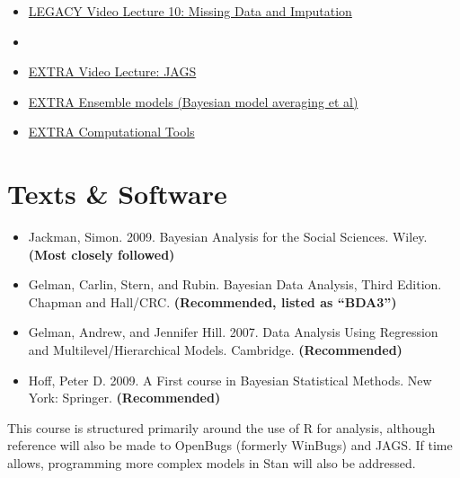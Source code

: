 \documentclass[11pt, leqno, fleqn]{article}
\begin{document}
\begin{itemize}
\item[] \href{http://youtu.be/qfpZcsb32Z4}{LEGACY Video Lecture 10: Missing Data and Imputation} \\
\item[]
\item[] \href{http://youtu.be/-89nkSHsFV4}{EXTRA Video Lecture: JAGS} \\
\item[] \href{https://www.youtube.com/watch?v=jAVHB3D04EY}{EXTRA Ensemble models (Bayesian model averaging et al)}\\
\item[] \href{https://www.youtube.com/watch?v=kcBcYev8oaU&index=6&list=PLAFC5F02F224FA59F}{EXTRA Computational Tools}\\
\end{itemize}

\section*{Texts \& Software}
\begin{itemize}
\item[] Jackman, Simon. 2009. Bayesian Analysis for the Social Sciences. Wiley. {\bf(Most closely followed)}
\item[] Gelman, Carlin, Stern, and Rubin. Bayesian Data Analysis, Third Edition. Chapman and Hall/CRC. {\bf(Recommended, listed as ``BDA3'')}
\item[] Gelman, Andrew, and Jennifer Hill. 2007. Data Analysis Using Regression and Multilevel/Hierarchical Models. Cambridge. {\bf(Recommended)}
\item[] Hoff, Peter D. 2009. A First course in Bayesian Statistical Methods. New York: Springer. {\bf (Recommended)}
\end{itemize}
This course is structured primarily around the use of \textsf{R} for analysis, although reference will also be made to OpenBugs (formerly WinBugs) and JAGS. If time allows, programming more complex models in Stan will also be addressed.\\
\end{document}
